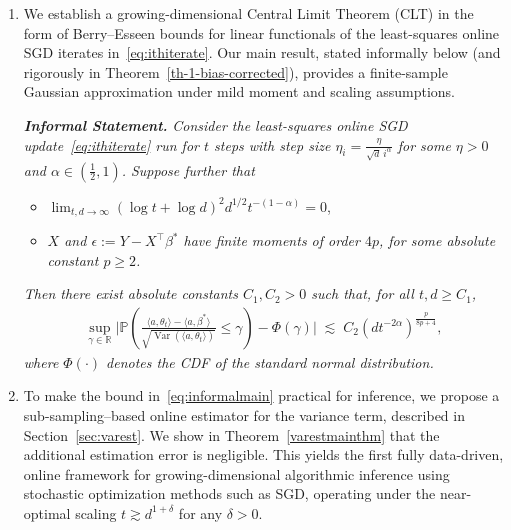 \documentclass[11pt, reqno,english]{amsart}
\DeclareMathOperator{\Var}{Var} \DeclareMathOperator{\N}{N}
\begin{document}
\begin{enumerate}[leftmargin=0.22in]
    \item[(1)] We establish a growing-dimensional Central Limit Theorem (CLT) in the form of Berry–Esseen bounds for linear functionals of the least-squares online SGD iterates in~\eqref{eq:ithiterate}. Our main result, stated informally below (and rigorously in Theorem~\ref{th-1-bias-corrected}), provides a finite-sample Gaussian approximation under mild moment and scaling assumptions.

    \vspace{2pt}
    \noindent\textbf{\textit{Informal Statement.}} \emph{Consider the least-squares online SGD update~\eqref{eq:ithiterate} run for $t$ steps with step size $\eta_i = \frac{\eta}{\sqrt{d}\, i^{\alpha}}$ for some $\eta>0$ and $\alpha \in (\tfrac{1}{2},1)$. Suppose further that}
    \begin{itemize}
        \item $\displaystyle \lim_{t,d \to \infty} (\log t + \log d)^2 d^{1/2} t^{-(1-\alpha)} = 0$,
        \item \emph{$X$ and $\epsilon := Y - X^\top \beta^*$ have finite moments of order $4p$, for some absolute constant $p \ge 2$.}
    \end{itemize}
    \emph{Then there exist absolute constants $C_1, C_2 > 0$ such that, for all $t,d \ge C_1$,}
    \begin{align}\label{eq:informalmain}
        \sup_{\gamma \in \mathbb{R}} 
        \bigg|
        \mathbb{P}\!\left(
        \frac{\langle a, \theta_t \rangle - \langle a, \beta^* \rangle}
        {\sqrt{\Var(\langle a, \theta_t \rangle)}}
        \le \gamma
        \right) - \Phi(\gamma)
        \bigg|
        \;\lesssim\;
        C_2 (d t^{-2\alpha})^{\frac{p}{8p + 4}},
    \end{align}
    \emph{where $\Phi(\cdot)$ denotes the CDF of the standard normal distribution.}

    \item[(2)] To make the bound in~\eqref{eq:informalmain} practical for inference, we propose a sub-sampling–based online estimator for the variance term, described in Section~\ref{sec:varest}. We show in Theorem~\ref{varestmainthm} that the additional estimation error is negligible. This yields the first fully data-driven, online framework for growing-dimensional algorithmic inference using stochastic optimization methods such as SGD, operating under the near-optimal scaling $t \gtrsim d^{1+\delta}$ for any $\delta > 0$.
\end{enumerate}
\end{document}
